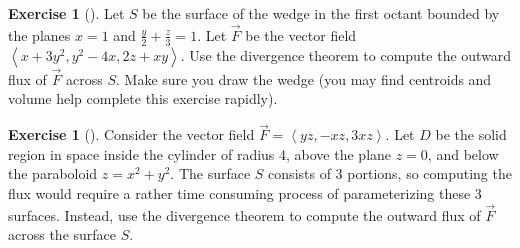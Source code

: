 \documentclass[10pt,]{book}
\theoremstyle{plain}
\theoremstyle{definition}
\theoremstyle{definition}
\theoremstyle{definition}
\theoremstyle{definition}
\newtheorem{exploration}[project]{Exercise}
\theoremstyle{definition}
\numberwithin{equation}{section}
\newcommand{\ds}{\displaystyle}
\newcommand{\lt}{<}
\begin{document}
\begin{exploration}[]\label{exploration-310}
Let \(S\) be the surface of the wedge in the first octant bounded by the planes \(x=1\) and \(\ds\frac{y}{2}+\frac{z}{3}=1\). Let \(\vec F\) be the vector field \(\left\lt x+3y^2,y^2-4x,2z+xy\right>\). Use the divergence theorem to compute the outward flux of \(\vec F\) across \(S\). Make sure you draw the wedge (you may find centroids and volume help complete this exercise rapidly).%
\end{exploration}
\begin{exploration}[]\label{exploration-311}
Consider the vector field \(\vec F = \left\lt yz,-xz,3xz\right>\). Let \(D\) be the solid region in space inside the cylinder of radius 4, above the plane \(z=0\), and below the paraboloid \(z=x^2+y^2\). The surface \(S\) consists of 3 portions, so computing the flux would require a rather time consuming process of parameterizing these 3 surfaces. Instead, use the divergence theorem to compute the outward flux of \(\vec F\) across the surface \(S\).%
\end{exploration}
%
\backmatter
%
%
%
\end{document}
